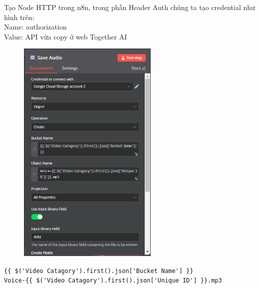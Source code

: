 \begin{itemize}[label=]
 Tạo Node HTTP trong n8n, trong phần Header Auth chúng ta tạo credential như hình trên:\\
 Name: authorization\\
 Value: API vừa copy ở web Together AI\\
     \begin{figure}[H]
    \centering
    \includegraphics[width=0.6\textwidth]{images/GGcloud-17.png}
    
    \end{figure}
       \verb|{{ $('Video Catagory').first().json['Bucket Name'] }}|\\
    \verb|Voice-{{ $('Video Catagory').first().json['Unique ID'] }}.mp3|

\end{itemize}

